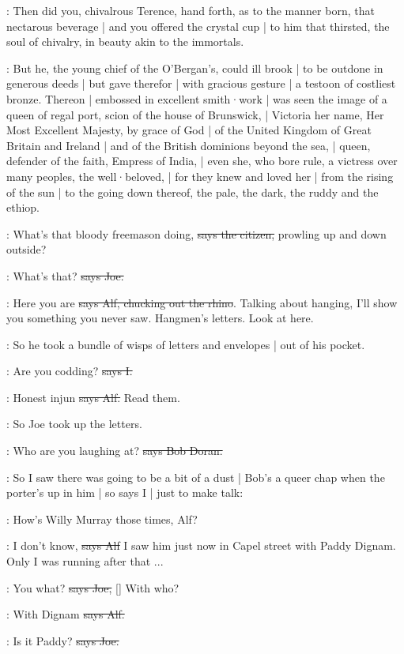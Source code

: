 :
Then did you,
chivalrous Terence,
hand forth,
as to the manner born,
that nectarous beverage |
and you offered the crystal cup |
to him that thirsted,
the soul of chivalry,
in beauty akin to the immortals.

:
But he,
the young chief of the O'Bergan's,
could ill brook |
to be outdone in generous deeds |
but gave therefor |
with gracious gesture |
a testoon of costliest bronze.
Thereon |
embossed in excellent smith·work |
was seen the image of a queen of regal port,
scion of the house of Brunswick, |
Victoria her name,
Her Most Excellent Majesty,
by grace of God |
of the United Kingdom of Great Britain and Ireland |
and of the British dominions beyond the sea, |
queen,
defender of the faith,
Empress of India, |
even she,
who bore rule,
a victress over many peoples,
the well·beloved, |
for they knew and loved her |
from the rising of the sun |
to the going down thereof,
the pale,
the dark,
the ruddy and the ethiop.

\citizen:
What's that bloody freemason doing,
\sout{says the citizen,}
prowling up and down outside?

\joe:
What's that?
\sout{says Joe.}

\bergan:
Here you are
\sout{says Alf,
chucking out the rhino}.
Talking about hanging,
I'll show you something you never saw.
Hangmen's letters.
Look at here.

\Nq:
So he took a bundle of wisps of letters and envelopes |
out of his pocket.

:
Are you codding?
\sout{says I.}

\bergan:
Honest injun
\sout{says Alf.}
Read them.

\Nq:
So Joe took up the letters.

\doran:
Who are you laughing at?
\sout{says Bob Doran.}

\Nq:
So I saw there was going to be a bit of a dust |
Bob's a queer chap when the porter's up in him |
so says I |
just to make talk:

:
How's Willy Murray those times,
Alf?

\bergan:
I don't know,
\sout{says Alf}
I saw him just now in Capel street with Paddy Dignam.
Only I was running after that ...

\joe:
You what?
\sout{says Joe,}
[]
With who?

\bergan:
With Dignam
\sout{says Alf.}

\joe:
Is it Paddy?
\sout{says Joe.}

